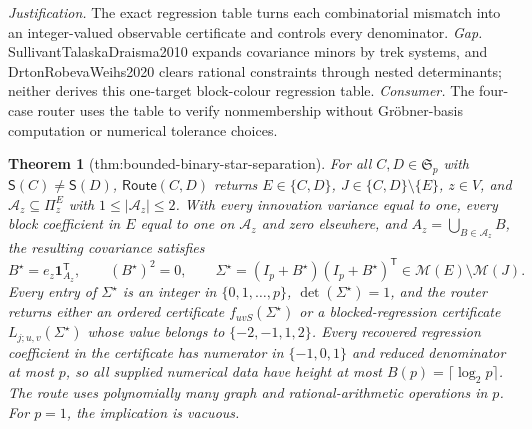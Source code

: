 \documentclass{article}
\newtheorem{theorem}{Theorem}
\begin{document}
\par\smallskip\noindent \textit{Justification.} The exact regression table turns each combinatorial mismatch into an integer-valued observable certificate and controls every denominator. \textit{Gap.} SullivantTalaskaDraisma2010 expands covariance minors by trek systems, and DrtonRobevaWeihs2020 clears rational constraints through nested determinants; neither derives this one-target block-colour regression table. \textit{Consumer.} The four-case router uses the table to verify nonmembership without Gröbner-basis computation or numerical tolerance choices.

\begin{theorem}[thm:bounded-binary-star-separation]\label{thm:bounded-binary-star-separation}
For all \(C,D\in\mathfrak S_p\) with \(\mathsf S(C)\neq\mathsf S(D)\), \(\mathsf{Route}(C,D)\) returns \(E\in\{C,D\}\), \(J\in\{C,D\}\setminus\{E\}\), \(z\in V\), and \(\mathcal A_z\subseteq\Pi^E_z\) with \(1\leq|\mathcal A_z|\leq2\). With every innovation variance equal to one, every block coefficient in \(E\) equal to one on \(\mathcal A_z\) and zero elsewhere, and \(A_z=\bigcup_{B\in\mathcal A_z}B\), the resulting covariance satisfies \[B^{\star}=e_z\mathbf 1_{A_z}^{\mathsf T},\qquad (B^{\star})^2=0,\qquad \Sigma^{\star}=(I_p+B^{\star})(I_p+B^{\star})^{\mathsf T}\in\mathcal M(E)\setminus\mathcal M(J).\] Every entry of \(\Sigma^{\star}\) is an integer in \(\{0,1,\ldots,p\}\), \(\det(\Sigma^{\star})=1\), and the router returns either an ordered certificate \(f_{uvS}(\Sigma^{\star})\) or a blocked-regression certificate \(L_{j;u,v}(\Sigma^{\star})\) whose value belongs to \(\{-2,-1,1,2\}\). Every recovered regression coefficient in the certificate has numerator in \(\{-1,0,1\}\) and reduced denominator at most \(p\), so all supplied numerical data have height at most \(B(p)=\lceil\log_2p\rceil\). The route uses polynomially many graph and rational-arithmetic operations in \(p\). For \(p=1\), the implication is vacuous.
\end{theorem}
\end{document}
